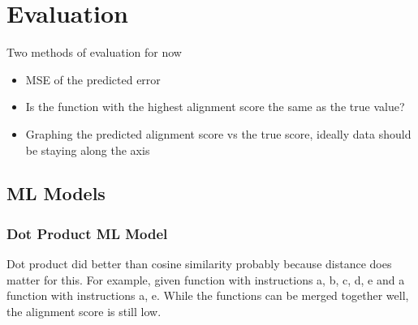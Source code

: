 \chapter{Evaluation}
Two methods of evaluation for now
\begin{itemize}
    \item MSE of the predicted error
    \item Is the function with the highest alignment score the same as the true value?
    \item Graphing the predicted alignment score vs the true score, ideally data should be staying along the axis
\end{itemize}


\section{ML Models}
\subsection{Dot Product ML Model}
Dot product did better than cosine similarity probably because distance does matter for this. For example, given function with instructions a, b, c, d, e and a function with instructions a, e. While the functions can be merged together well, the alignment score is still low.